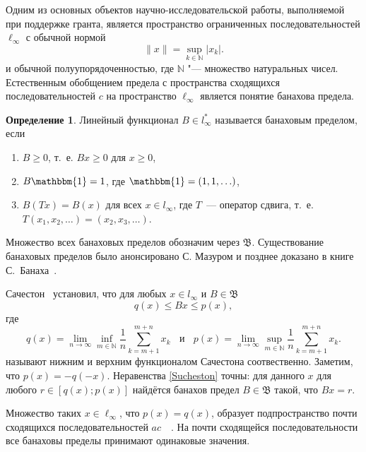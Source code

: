 \documentclass[a4paper,openbib]{report}
\renewcommand{\geq}{\geqslant} %
\theoremstyle{definition}
\newtheorem{definition}[lemma]{Определение}
\begin{document}

\setcounter{page}{2}

Одним из основных объектов научно-исследовательской работы, выполняемой при поддержке гранта,
является пространство ограниченных последовательностей $\ell_\infty$ с обычной нормой
\begin{equation*}
	\|x\| = \sup_{k\in\mathbb{N}} |x_k|
	.
\end{equation*}
и обычной полуупорядоченностью, где $\mathbb{N}$ "--- множество натуральных чисел.
Естественным обобщением предела с пространства сходящихся последовательностей $c$ на пространство $\ell_\infty$
является понятие банахова предела.


\begin{definition}
	Линейный функционал $B\in l_\infty^*$ называется банаховым пределом,
	если
	\begin{enumerate}
		\item
			$B\geq0$, т.~е. $Bx \geq 0$ для $x \geq 0$,
		\item
			$B\mathbbm{1}=1$, где $\mathbbm{1} =(1,1,\ldots)$,
		\item
			$B(Tx)=B(x)$ для всех $x\in l_\infty$, где $T$~---
		оператор сдвига, т.~е. $T(x_1,x_2,\ldots)=(x_2,x_3,\ldots)$.
	\end{enumerate}
\end{definition}
Множество всех банаховых пределов обозначим через $\mathfrak{B}$.
Существование банаховых пределов было анонсировано С. Мазуром \cite{Mazur} и позднее доказано в книге С.~Банаха~\cite{B}. 


Сачестон~\cite{sucheston1967banach} установил, что
для любых $x\in l_\infty$ и $B\in\mathfrak{B}$
\begin{equation}\label{Sucheston}
	q(x) \leqslant Bx \leqslant p(x)
	,
\end{equation}
где
\begin{equation*}
	q(x) = \lim_{n\to\infty} \inf_{m\in\mathbb{N}}  \frac{1}{n} \sum_{k=m+1}^{m+n} x_k
	~~~~\mbox{и}~~~~
	p(x) = \lim_{n\to\infty} \sup_{m\in\mathbb{N}}  \frac{1}{n} \sum_{k=m+1}^{m+n} x_k
	.
\end{equation*}
называют нижним и верхним функционалом Сачестона соотвественно.
Заметим, что $p(x) = -q(-x)$.
Неравенства \eqref{Sucheston} точны:
для данного $x$ для любого $r\in[q(x); p(x)]$ найдётся банахов предел
$B\in\mathfrak{B}$ такой, что $Bx = r$.

Множество таких $x\in\ell_\infty$, что $p(x)=q(x)$,
образует подпространство почти сходящихся последовательностей $ac$~~\cite{lorentz1948contribution}.
На почти сходящейся последовательности все банаховы пределы принимают одинаковые значения.
\end{document}
